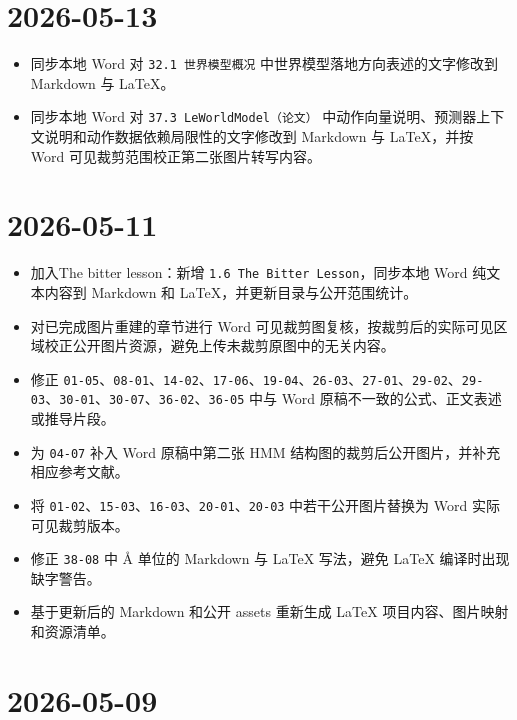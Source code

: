 \hypertarget{section-3}{%
\section{2026-05-13}\label{section-3}}

\begin{itemize}
\tightlist
\item
  同步本地 Word 对 \texttt{32.1\ 世界模型概况} 中世界模型落地方向表述的文字修改到 Markdown 与 LaTeX。
\item
  同步本地 Word 对 \texttt{37.3\ LeWorldModel（论文）} 中动作向量说明、预测器上下文说明和动作数据依赖局限性的文字修改到 Markdown 与 LaTeX，并按 Word 可见裁剪范围校正第二张图片转写内容。
\end{itemize}

\hypertarget{section-4}{%
\section{2026-05-11}\label{section-4}}

\begin{itemize}
\tightlist
\item
  加入The bitter lesson：新增 \texttt{1.6\ The\ Bitter\ Lesson}，同步本地 Word 纯文本内容到 Markdown 和 LaTeX，并更新目录与公开范围统计。
\item
  对已完成图片重建的章节进行 Word 可见裁剪图复核，按裁剪后的实际可见区域校正公开图片资源，避免上传未裁剪原图中的无关内容。
\item
  修正 \texttt{01-05}、\texttt{08-01}、\texttt{14-02}、\texttt{17-06}、\texttt{19-04}、\texttt{26-03}、\texttt{27-01}、\texttt{29-02}、\texttt{29-03}、\texttt{30-01}、\texttt{30-07}、\texttt{36-02}、\texttt{36-05} 中与 Word 原稿不一致的公式、正文表述或推导片段。
\item
  为 \texttt{04-07} 补入 Word 原稿中第二张 HMM 结构图的裁剪后公开图片，并补充相应参考文献。
\item
  将 \texttt{01-02}、\texttt{15-03}、\texttt{16-03}、\texttt{20-01}、\texttt{20-03} 中若干公开图片替换为 Word 实际可见裁剪版本。
\item
  修正 \texttt{38-08} 中 Å 单位的 Markdown 与 LaTeX 写法，避免 LaTeX 编译时出现缺字警告。
\item
  基于更新后的 Markdown 和公开 assets 重新生成 LaTeX 项目内容、图片映射和资源清单。
\end{itemize}

\hypertarget{section-5}{%
\section{2026-05-09}\label{section-5}}

